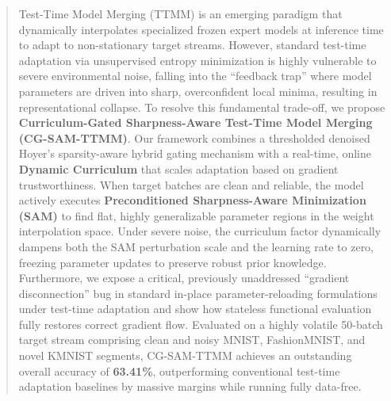 \documentclass{article}
\theoremstyle{plain}
\theoremstyle{definition}
\theoremstyle{remark}
\begin{document}

\printAffiliationsAndNotice{} %

\begin{abstract}
Test-Time Model Merging (TTMM) is an emerging paradigm that dynamically interpolates specialized frozen expert models at inference time to adapt to non-stationary target streams. However, standard test-time adaptation via unsupervised entropy minimization is highly vulnerable to severe environmental noise, falling into the ``feedback trap'' where model parameters are driven into sharp, overconfident local minima, resulting in representational collapse. To resolve this fundamental trade-off, we propose \textbf{Curriculum-Gated Sharpness-Aware Test-Time Model Merging (CG-SAM-TTMM)}. Our framework combines a thresholded denoised Hoyer's sparsity-aware hybrid gating mechanism with a real-time, online \textbf{Dynamic Curriculum} that scales adaptation based on gradient trustworthiness. When target batches are clean and reliable, the model actively executes \textbf{Preconditioned Sharpness-Aware Minimization (SAM)} to find flat, highly generalizable parameter regions in the weight interpolation space. Under severe noise, the curriculum factor dynamically dampens both the SAM perturbation scale and the learning rate to zero, freezing parameter updates to preserve robust prior knowledge. Furthermore, we expose a critical, previously unaddressed ``gradient disconnection'' bug in standard in-place parameter-reloading formulations under test-time adaptation and show how stateless functional evaluation fully restores correct gradient flow. Evaluated on a highly volatile 50-batch target stream comprising clean and noisy MNIST, FashionMNIST, and novel KMNIST segments, CG-SAM-TTMM achieves an outstanding overall accuracy of \textbf{63.41\%}, outperforming conventional test-time adaptation baselines by massive margins while running fully data-free.
\end{abstract}
\end{document}
